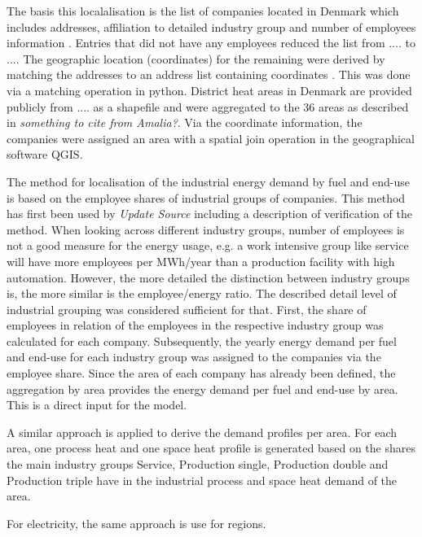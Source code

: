 \documentclass[review]{elsarticle}
\begin{document}
The basis this localalisation is the list of companies located in Denmark which includes addresses, affiliation to detailed industry group and number of employees information \cite{virk2017}. Entries that did not have any employees reduced the list from .... to .... The geographic location (coordinates) for the remaining were derived by matching the addresses to an address list containing coordinates \cite{}. This was done via a matching operation in python.  District heat areas in Denmark are provided publicly from .... as a shapefile \cite{kortforsyningen2017} and were aggregated to the 36 areas as described in \cite{Petrovic2014} \textit{something to cite from Amalia?}. Via the coordinate information, the companies were assigned an area with a spatial join operation in the geographical software QGIS.

The method for localisation of the industrial energy demand by fuel and end-use is based on the employee shares of industrial groups of companies. This method has first been used by \cite{Buehler2017} \textit{Update Source} including a description of verification of the method. When looking across different industry groups, number of employees is not a good measure for the energy usage, e.g. a work intensive group like service will have more employees per MWh/year than a production facility with high automation. However, the more detailed the distinction between industry groups is, the more similar is the employee/energy ratio. The described detail level of industrial grouping was considered sufficient for that. First, the share of employees in relation of the employees in the respective industry group was calculated for each company. Subsequently, the yearly energy demand per fuel and end-use for each industry group was assigned to the companies via the employee share. Since the area of each company has already been defined, the aggregation by area provides the energy demand per fuel and end-use by area. This is a direct input for the model.

A similar approach is applied to derive the demand profiles per area. For each area, one process heat and one space heat profile is generated based on the shares the main industry groups Service, Production single, Production double and Production triple have in the industrial process and space heat demand of the area.

For electricity, the same approach is use for regions. 

\end{document}
